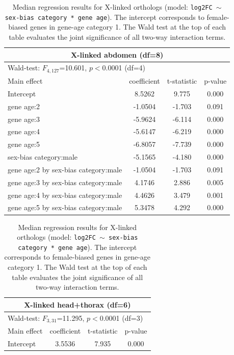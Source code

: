 \documentclass{article}
\begin{document}
\begin{table}[H]
    \centering
    \caption{Median regression results for X-linked orthologs (model: \texttt{log2FC $\sim$ sex-bias category * gene age}). 
    The intercept corresponds to female-biased genes in gene-age category 1. 
    The Wald test at the top of each table evaluates the joint significance of all two-way interaction terms.}
    \label{SItab:X_logFCconservation}
    \begin{tabular}{l |c |c | c}
        \multicolumn{4}{c}{X-linked abdomen (df=8)}\\
        \hline
        \multicolumn{4}{l}{Wald-test: $F_{4,127}$=10.601, $p<$0.0001 (df=4)}\\
        \hline
        Main effect & coefficient &t-statistic & p-value \\
        \hline
        \hline
        Intercept & 8.5262 & 9.775 & 0.000 \\
        \hline
        gene age:2 & -1.0504 & -1.703 & 0.091 \\
        \hline
        gene age:3 & -5.9624 & -6.114 & 0.000 \\
        \hline
        gene age:4 & -5.6147 & -6.219 & 0.000 \\
        \hline
        gene age:5 & -6.8057 & -7.739 & 0.000 \\
        \hline
        sex-bias category:male & -5.1565 & -4.180 & 0.000 \\
        \hline
        gene age:2 by sex-bias category:male & -1.0504 & -1.703 & 0.091 \\
        \hline
        gene age:3 by sex-bias category:male &  4.1746 &  2.886 & 0.005 \\
        \hline
        gene age:4 by sex-bias category:male &  4.4626 &  3.479 & 0.001 \\
        \hline
        gene age:5 by sex-bias category:male &  5.3478 &  4.292 & 0.000 \\
        \hline
    \end{tabular}
    \vspace{1cm}
    \begin{tabular}{l |c |c | c}
        \multicolumn{4}{c}{X-linked head+thorax (df=6)}\\
        \hline
        \multicolumn{4}{l}{Wald-test: $F_{3,31}$=11.295, $p<$0.0001 (df=3)}\\
        \hline
        Main effect & coefficient & t-statistic & p-value \\
        \hline
        \hline
        Intercept & 3.5536 &  7.935 & 0.000 \\

\end{tabular}
\end{table}
\end{document}
